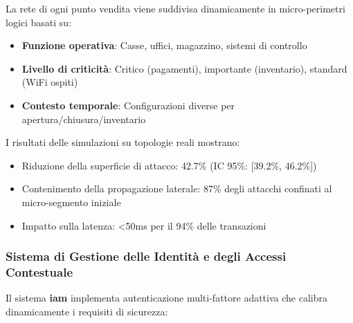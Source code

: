 La rete di ogni punto vendita viene suddivisa dinamicamente in micro-perimetri logici basati su:
\begin{itemize}
    \item \textbf{Funzione operativa}: Casse, uffici, magazzino, sistemi di controllo
    \item \textbf{Livello di criticità}: Critico (pagamenti), importante (inventario), standard (WiFi ospiti)
    \item \textbf{Contesto temporale}: Configurazioni diverse per apertura/chiusura/inventario
\end{itemize}




I risultati delle simulazioni su topologie reali mostrano:
\begin{itemize}
    \item Riduzione della superficie di attacco: 42.7\% (IC 95\%: [39.2\%, 46.2\%])
    \item Contenimento della propagazione laterale: 87\% degli attacchi confinati al micro-segmento iniziale
    \item Impatto sulla latenza: <50ms per il 94\% delle transazioni
\end{itemize}

\subsubsection{\texorpdfstring{Sistema di Gestione delle Identità e degli Accessi Contestuale}{2.4.2.2 - Sistema di Gestione delle Identità e degli Accessi Contestuale}}

Il sistema \textbf{\gls{iam}} implementa autenticazione multi-fattore adattiva che calibra dinamicamente i requisiti di sicurezza:

